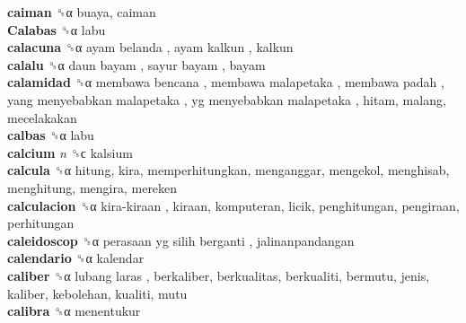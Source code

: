 \textbf{caiman} ␝α  buaya, caiman  \\
\textbf{Calabas} ␝α  labu  \\
\textbf{calacuna} ␝α   ayam belanda ,  ayam kalkun , kalkun  \\
\textbf{calalu} ␝α   daun bayam ,  sayur bayam , bayam  \\
\textbf{calamidad} ␝α   membawa bencana ,  membawa malapetaka ,  membawa padah ,  yang menyebabkan malapetaka ,  yg menyebabkan malapetaka , hitam, malang, mecelakakan  \\
\textbf{calbas} ␝α  labu  \\
\textbf{calcium} \emph{n}  ␝ϲ  kalsium  \\
\textbf{calcula} ␝α  hitung, kira, memperhitungkan, menganggar, mengekol, menghisab, menghitung, mengira, mereken  \\
\textbf{calculacion} ␝α   kira-kiraan , kiraan, komputeran, licik, penghitungan, pengiraan, perhitungan  \\
\textbf{caleidoscop} ␝α   perasaan yg silih berganti , jalinanpandangan  \\
\textbf{calendario} ␝α  kalendar  \\
\textbf{caliber} ␝α   lubang laras , berkaliber, berkualitas, berkualiti, bermutu, jenis, kaliber, kebolehan, kualiti, mutu  \\
\textbf{calibra} ␝α  menentukur  \\
